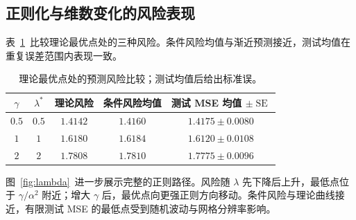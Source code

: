 \documentclass[UTF8,fontset=fandol,a4paper,zihao=-4]{ctexart}
\begin{document}
\subsection{正则化与维数变化的风险表现}
表~\ref{tab:risk}~比较理论最优点处的三种风险。条件风险均值与渐近预测接近，测试均值在重复误差范围内表现一致。
\begin{table}[htbp]\centering\small
\caption{理论最优点处的预测风险比较；测试均值后给出标准误。}\label{tab:risk}
\begin{tabular}{ccccc}\toprule
$\gamma$ & $\lambda^*$ & 理论风险 & 条件风险均值 & 测试 MSE 均值 $\pm\operatorname{SE}$ \\ \midrule
$0.5$ & $0.5$ & $1.4142$ & $1.4160$ & $1.4175\pm0.0080$ \\
$1$ & $1$ & $1.6180$ & $1.6184$ & $1.6120\pm0.0108$ \\
$2$ & $2$ & $1.7808$ & $1.7810$ & $1.7775\pm0.0096$ \\
\bottomrule\end{tabular}\end{table}
图~\ref{fig:lambda}~进一步展示完整的正则路径。风险随 $\lambda$ 先下降后上升，最低点位于 $\gamma/\alpha^2$ 附近；增大 $\gamma$ 后，最优点向更强正则方向移动。条件风险与理论曲线接近，有限测试 MSE 的最低点受到随机波动与网格分辨率影响。
\end{document}
